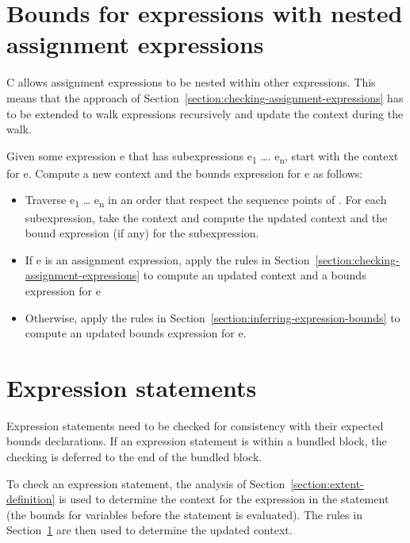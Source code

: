 \section{Bounds for expressions with nested assignment expressions}
\label{section:checking-nested-assignment-expressions}

C allows assignment expressions to be nested within other expressions.
This means that the approach of 
Section~\ref{section:checking-assignment-expressions} has to be extended to walk
expressions recursively and update the context during the walk.

Given some expression e that has subexpressions e\textsubscript{1}
\ldots{}. e\textsubscript{n}, start with the context for e. Compute a
new context and the bounds expression for e as follows:

\begin{itemize}
\item
  Traverse e\textsubscript{1} \ldots{} e\textsubscript{n} in an order
  that respect the sequence points of \cite{ISO2011}. For each subexpression, take the
  context and compute the updated context and the bound expression (if
  any) for the subexpression.
\item
  If e is an assignment expression, 
  apply the rules in Section~\ref{section:checking-assignment-expressions} to
  compute an updated context and a bounds expression for e
\item
  Otherwise, apply the rules in Section~\ref{section:inferring-expression-bounds}
  to compute an updated bounds
  expression for e.
\end{itemize}

\section{Expression statements}
\label{section:checking-expression-statements}

Expression statements need to be checked for consistency with their
expected bounds declarations. If an expression statement is within a
bundled block, the checking is deferred to the end of the bundled block.

To check an expression statement, the analysis of 
Section~\ref{section:extent-definition} is used
to determine the context for the expression in the statement (the bounds
for variables before the statement is evaluated). The rules in 
Section~\ref{section:checking-nested-assignment-expressions}
are then used to determine the updated context.

